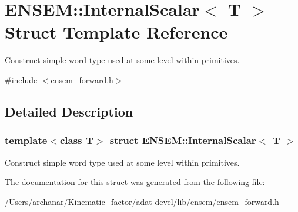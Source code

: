 \hypertarget{structENSEM_1_1InternalScalar}{}\section{E\+N\+S\+EM\+:\+:Internal\+Scalar$<$ T $>$ Struct Template Reference}
\label{structENSEM_1_1InternalScalar}


Construct simple word type used at some level within primitives.  




{\ttfamily \#include $<$ensem\+\_\+forward.\+h$>$}



\subsection{Detailed Description}
\subsubsection*{template$<$class T$>$\newline
struct E\+N\+S\+E\+M\+::\+Internal\+Scalar$<$ T $>$}

Construct simple word type used at some level within primitives. 

The documentation for this struct was generated from the following file\+:\begin{DoxyCompactItemize}
\item 
/\+Users/archanar/\+Kinematic\+\_\+factor/adat-\/devel/lib/ensem/\mbox{\hyperlink{adat-devel_2lib_2ensem_2ensem__forward_8h}{ensem\+\_\+forward.\+h}}\end{DoxyCompactItemize}
